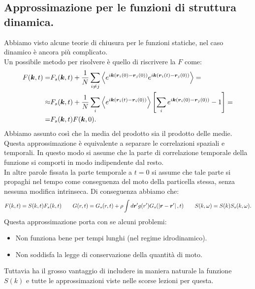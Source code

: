 \subsection{Approssimazione per le funzioni di struttura dinamica.}
\label{subsec:Approssimazione per le funzioni di struttura dinamica.}
Abbiamo visto alcune teorie di chiusura per le funzioni statiche, nel caso dinamico è ancora più complicato. \\
Un possibile metodo per risolvere è quello di riscrivere la $F$ come:
\[\begin{aligned}
	F(\boldsymbol{k},t) 
	=&
	F_s(\boldsymbol{k},t) + \frac{1}{N}
	\sum_{i\neq j}^{} 
	\left<e^{i\boldsymbol{k}\left( \boldsymbol{r}_i(0)-\boldsymbol{r}_j(0) \right)}
	e^{i \boldsymbol{k}\left( \boldsymbol{r}_i(t)-\boldsymbol{r}_j(0) \right)}\right> =\\
	\approx &
	F_s(\boldsymbol{k},t) + \frac{1}{N}
	\sum_{i}^{} \left<e^{i\boldsymbol{k}\left( \boldsymbol{r}_i(t)-\boldsymbol{r}_i(0) \right) } \right>
	\left[ \sum_{i}^{} e^{i\boldsymbol{k}\left( \boldsymbol{r}_i(0)-\boldsymbol{r}_j(0) \right) }-1 \right] =\\
	=&
	F_s(\boldsymbol{k},t)F(\boldsymbol{k},0)
.\end{aligned}\]
Abbiamo assunto così che la media del prodotto sia il prodotto delle medie. Questa approssimazione è equivalente a separare le correlazioni spaziali e temporali. In questo modo si assume che la parte di correlazione temporale della funzione si comporti in modo indipendente dal resto.\\
In altre parole fissata la parte temporale a $t=0$ si assume che tale parte si propaghi nel tempo come conseguenza del moto della particella stessa, senza nessuna modifica intrinseca. Di conseguenza abbiamo che:
\[
	F(k,t)=S(k,t)F_s(k,t) \quad \quad 
	G(r,t) = G_s(r,t)+\rho 
	\int d\boldsymbol{r}'g(r')G_s(\left| \boldsymbol{r}-\boldsymbol{r}' \right|, t) \quad \quad
	S(k,\omega ) = S(k)S_s(k,\omega )
.\] 
Questa approssimazione porta con se alcuni problemi:
\begin{itemize}
	\item Non funziona bene per tempi lunghi (nel regime idrodinamico).
	\item Non soddisfa la legge di conservazione della quantità di moto.
\end{itemize}
Tuttavia ha il grosso vantaggio di includere in maniera naturale la funzione $S(k)$ e tutte le approssimazioni viste nelle scorse lezioni per questa.\\
